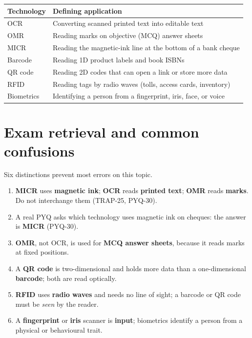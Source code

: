 \begin{center}
\begin{tabular}{p{}p{}}
\toprule
\textbf{Technology} & \textbf{Defining application} \\
\midrule
OCR & Converting scanned printed text into editable text \\
OMR & Reading marks on objective (MCQ) answer sheets \\
MICR & Reading the magnetic-ink line at the bottom of a bank cheque \\
Barcode & Reading 1D product labels and book ISBNs \\
QR code & Reading 2D codes that can open a link or store more data \\
RFID & Reading tags by radio waves (tolls, access cards, inventory) \\
Biometrics & Identifying a person from a fingerprint, iris, face, or voice \\
\bottomrule
\end{tabular}
\end{center}

\section{Exam retrieval and common confusions}
Six distinctions prevent most errors on this topic.
\begin{enumerate}
  \item \textbf{MICR} uses \textbf{magnetic ink}; \textbf{OCR} reads
    \textbf{printed text}; \textbf{OMR} reads \textbf{marks}. Do not
    interchange them (TRAP-25, PYQ-30).
  \item A real PYQ asks which technology uses magnetic ink on cheques: the
    answer is \textbf{MICR} (PYQ-30).
  \item \textbf{OMR}, not OCR, is used for \textbf{MCQ answer sheets},
    because it reads marks at fixed positions.
  \item A \textbf{QR code} is two-dimensional and holds more data than a
    one-dimensional \textbf{barcode}; both are read optically.
  \item \textbf{RFID} uses \textbf{radio waves} and needs no line of sight;
    a barcode or QR code must be \emph{seen} by the reader.
  \item A \textbf{fingerprint} or \textbf{iris} scanner is \textbf{input};
    biometrics identify a person from a physical or behavioural trait.
\end{enumerate}

